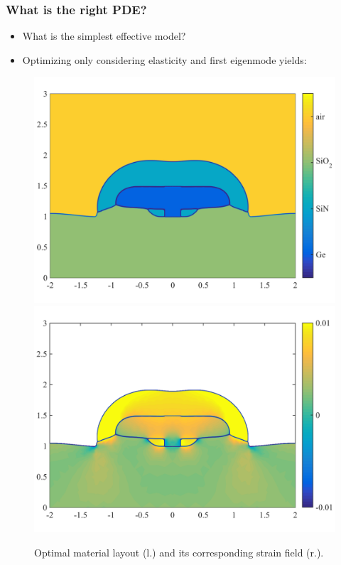 \documentclass[aspectratio=169,xcolor=dvipsnames,10pt]{beamer}
\begin{document}

\begin{frame}\frametitle{What is the right PDE?}

\begin{example}
\begin{itemize}
\item What is the simplest effective model?
\item Optimizing only considering elasticity and first eigenmode yields:
\end{itemize}
\begin{figure}
\centering
\includegraphics[width=0.3\linewidth]{Part I/figures/topo_FINAL_color.png}
\includegraphics[width=0.3\linewidth]{Part I/figures/strain_FINAL.png}
\caption{\footnotesize Optimal material layout (l.) and its corresponding strain field (r.).}
\label{Figure phi}
\end{figure}
\end{example}
\end{frame}
\end{document}
